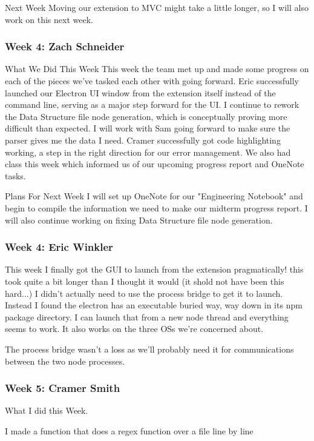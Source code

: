 Next Week
Moving our extension to MVC might take a little longer, so I will also work on this next week. 

\subsubsection{Week 4: Zach Schneider}

What We Did This Week
This week the team met up and made some progress on each of the pieces we've tasked each other with going forward. Eric successfully launched our Electron UI window from the extension itself instead of the command line, serving as a major step forward for the UI. I continue to rework the Data Structure file node generation, which is conceptually proving more difficult than expected. I will work with Sam going forward to make sure the parser gives me the data I need. Cramer successfully got code highlighting working, a step in the right direction for our error management. We also had class this week which informed us of our upcoming progress report and OneNote tasks.

Plans For Next Week
I will set up OneNote for our "Engineering Notebook" and begin to compile the information we need to make our midterm progress report. I will also continue working on fixing Data Structure file node generation.

\subsubsection{Week 4: Eric Winkler}

This week I finally got the GUI to launch from the extension pragmatically! this took quite a bit longer than I thought it would (it shold not have been this hard...) I didn't actually need to use the process bridge to get it to launch. Instead I found the electron has an executable buried way, way down in its npm package directory. I can launch that from a new node thread and everything seems to work. It also works on the three OSs we're concerned about. 

The process bridge wasn't a loss as we'll probably need it for communications between the two node processes.

\subsubsection{Week 5: Cramer Smith}

What I did this Week.

I made a function that does a regex function over a file line by line

